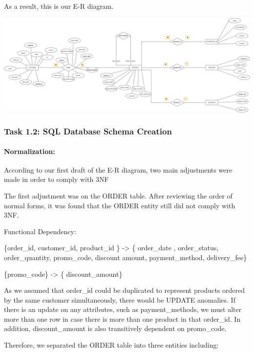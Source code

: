 \documentclass[
  letterpaper,
  DIV=11,
  numbers=noendperiod]{scrartcl}
\let\oldparagraph\paragraph
\renewcommand{\paragraph}[1]{\oldparagraph{#1}\mbox{}}
\begin{document}
As a result, this is our E-R diagram.

\includegraphics{images/E-R Diagram(Final)-Before Final.drawio.png}

\hypertarget{task-1.2-sql-database-schema-creation}{%
\subsubsection{Task 1.2: SQL Database Schema
Creation}\label{task-1.2-sql-database-schema-creation}}

\hypertarget{normalization}{%
\paragraph{Normalization:}\label{normalization}}

According to our first draft of the E-R diagram, two main adjustments
were made in order to comply with 3NF

The first adjustment was on the ORDER table. After reviewing the order
of normal forms, it was found that the ORDER entity still did not comply
with 3NF.

Functional Dependency:

\{order\_id, customer\_id, product\_id \} -\textgreater{} \{ order\_date
, order\_status, order\_quantity, promo\_code, discount amount,
payment\_method, delivery\_fee\}

\{promo\_code\} -\textgreater{} \{ discount\_amount\}

As we assumed that order\_id could be duplicated to represent products
ordered by the same customer simultaneously, there would be UPDATE
anomalies. If there is an update on any attributes, such as
payment\_methods, we must alter more than one row in case there is more
than one product in that order\_id. In addition, discount\_amount is
also transitively dependent on promo\_code.

Therefore, we separated the ORDER table into three entities including:
\end{document}
